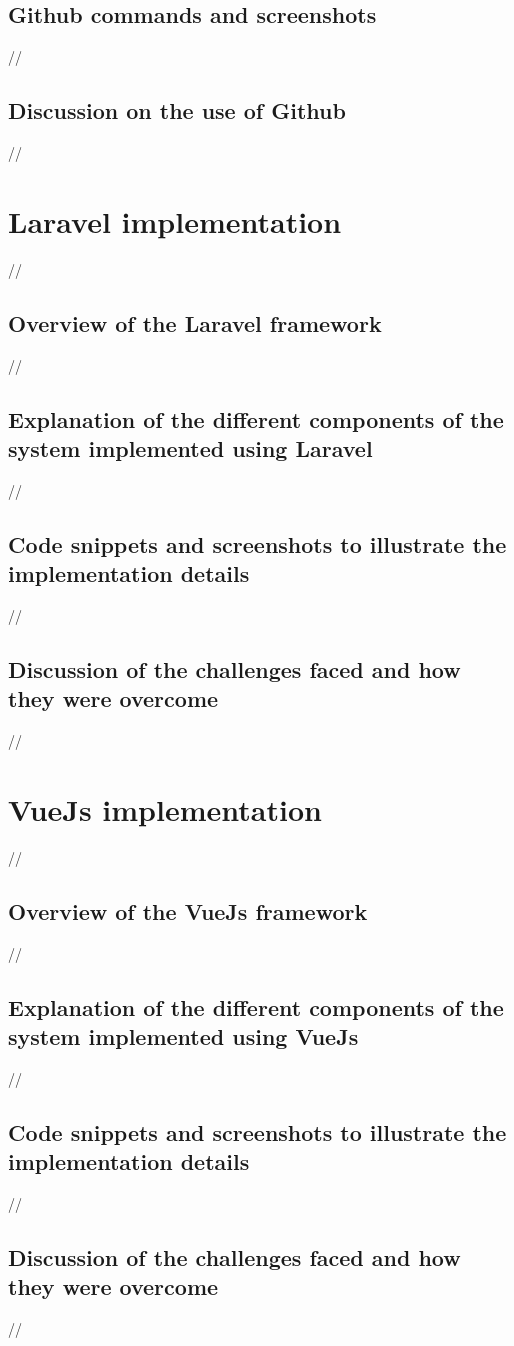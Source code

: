 \subsection{Github commands and screenshots  }
//
\subsection{Discussion on the use of Github}
//
\section {Laravel implementation}
//
\subsection {Overview of the Laravel framework}
//
\subsection {Explanation of the different components of the system implemented using Laravel}
//
\subsection {Code snippets and screenshots to illustrate the implementation details}
//
\subsection {Discussion of the challenges faced and how they were overcome}

//

\section {VueJs implementation}
//
\subsection {Overview of the VueJs framework}
//
\subsection {Explanation of the different components of the system implemented using VueJs}
//
\subsection {Code snippets and screenshots to illustrate the implementation details}
//
\subsection {Discussion of the challenges faced and how they were overcome}
//


